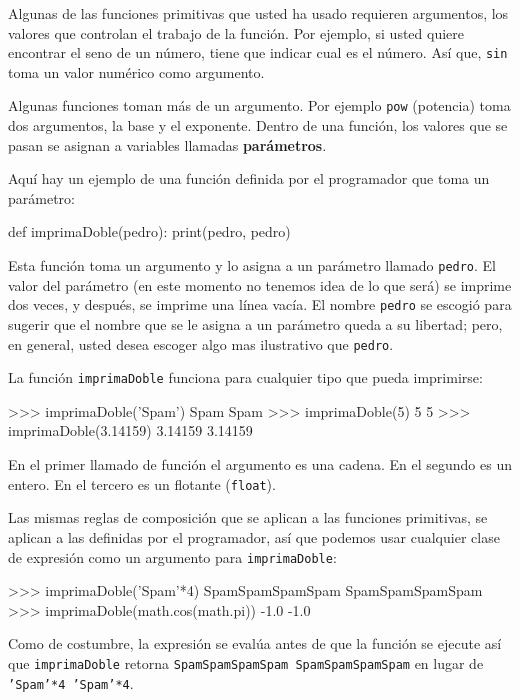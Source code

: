 \label{parameters}  
 

Algunas de las funciones primitivas que usted ha usado requieren argumentos,
los valores que controlan el trabajo de la función. Por ejemplo, si
usted quiere encontrar el seno de un número, tiene que indicar cual
es el número. Así que, \texttt{sin} toma un valor numérico como argumento.

Algunas funciones toman más de un argumento. Por ejemplo \texttt{pow}
(potencia) toma dos argumentos, la base y el exponente. Dentro de
una función, los valores que se pasan se asignan a variables llamadas
\textbf{parámetros}.

Aquí hay un ejemplo de una función definida por el programador que
toma un parámetro:

\begin{pythoncode}
def imprimaDoble(pedro):
  print(pedro, pedro)
\end{pythoncode}
 Esta función toma un argumento y lo asigna a un parámetro llamado
\texttt{pedro}. El valor del parámetro (en este momento no tenemos
idea de lo que será) se imprime dos veces, y después, se imprime una
línea vacía. El nombre \texttt{pedro} se escogió para sugerir que
el nombre que se le asigna a un parámetro queda a su libertad; pero,
en general, usted desea escoger algo mas ilustrativo que \texttt{pedro}.

La función \texttt{imprimaDoble} funciona para cualquier tipo que
pueda imprimirse:

\begin{pyconcode}
>>> imprimaDoble('Spam')
Spam Spam
>>> imprimaDoble(5)
5 5
>>> imprimaDoble(3.14159)
3.14159 3.14159
\end{pyconcode}
 En el primer llamado de función el argumento es una cadena. En el
segundo es un entero. En el tercero es un flotante (\texttt{float}).

Las mismas reglas de composición que se aplican a las funciones primitivas,
se aplican a las definidas por el programador, así que podemos usar
cualquier clase de expresión como un argumento para \texttt{imprimaDoble}:

\begin{pyconcode}
>>> imprimaDoble('Spam'*4)
SpamSpamSpamSpam SpamSpamSpamSpam
>>> imprimaDoble(math.cos(math.pi))
-1.0 -1.0
\end{pyconcode}
 Como de costumbre, la expresión se evalúa antes de que la función
se ejecute así que \texttt{imprimaDoble} retorna \texttt{SpamSpamSpamSpam
SpamSpamSpamSpam} en lugar de \texttt{'Spam'{*}4 'Spam'{*}4}.

